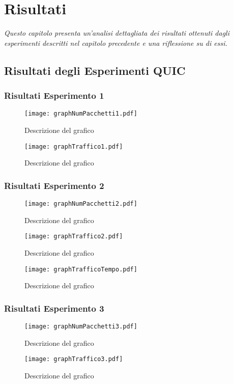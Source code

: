 \chapter{Risultati}
\label{cap:risultati}

\textit{\indent Questo capitolo presenta un'analisi dettagliata dei risultati ottenuti dagli esperimenti descritti nel capitolo precedente e una riflessione su di essi.}

\section{Risultati degli Esperimenti QUIC}
\subsection{Risultati Esperimento 1}
\begin{figure}[h!]
    \centering
    \texttt{[image: graphNumPacchetti1.pdf]}
    \caption{Descrizione del grafico}
    \label{fig:grafico1}
\end{figure}
\begin{figure}[h!]
    \centering
    \texttt{[image: graphTraffico1.pdf]}
    \caption{Descrizione del grafico}
    \label{fig:grafico12}
\end{figure}
\subsection{Risultati Esperimento 2}
\begin{figure}[h!]
    \centering
    \texttt{[image: graphNumPacchetti2.pdf]}
    \caption{Descrizione del grafico}
    \label{fig:grafico2}
\end{figure}
\begin{figure}[h!]
    \centering
    \texttt{[image: graphTraffico2.pdf]}
    \caption{Descrizione del grafico}
    \label{fig:grafico12}
\end{figure}
\begin{figure}[h!]
    \centering
    \texttt{[image: graphTrafficoTempo.pdf]}
    \caption{Descrizione del grafico}
    \label{fig:grafico12}
\end{figure}
\subsection{Risultati Esperimento 3}
\begin{figure}[h!]
    \centering
    \texttt{[image: graphNumPacchetti3.pdf]}
    \caption{Descrizione del grafico}
    \label{fig:grafico3}
\end{figure}
\begin{figure}[h!]
    \centering
    \texttt{[image: graphTraffico3.pdf]}
    \caption{Descrizione del grafico}
    \label{fig:grafico12}
\end{figure}
